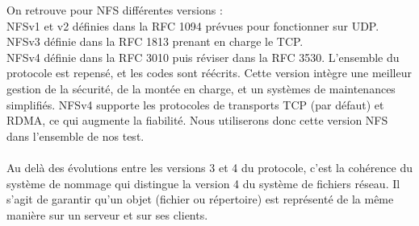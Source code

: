 \documentclass[12pt]{report}
\begin{document}
    On retrouve pour NFS différentes versions :\\
    NFSv1 et v2 définies dans la RFC 1094 prévues pour fonctionner sur UDP.\\
    NFSv3 définie dans la RFC 1813 prenant en charge le TCP.\\
    NFSv4 définie dans la RFC 3010 puis réviser dans la RFC 3530. L'ensemble du protocole est repensé, et les codes sont réécrits.
    Cette version intègre une meilleur gestion de la sécurité, de la montée en charge, et un systèmes de maintenances simplifiés.
    NFSv4 supporte les protocoles de transports TCP (par défaut) et RDMA, ce qui augmente la fiabilité. Nous utiliserons donc cette version NFS dans l'ensemble de nos test.\\\\
Au delà des évolutions entre les versions 3 et 4 du protocole, c'est la cohérence du système de nommage qui distingue la version 4 du système de fichiers réseau. Il s'agit de garantir qu'un objet (fichier ou répertoire) est représenté de la même manière sur un serveur et sur ses clients.
    
\end{document}
